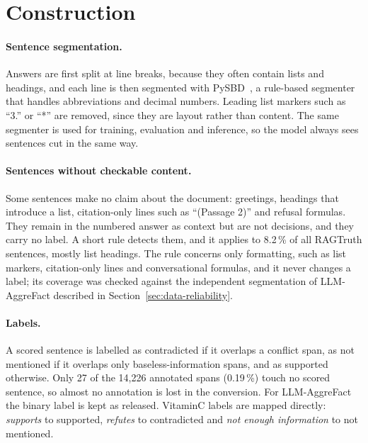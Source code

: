 \section{Construction}
\label{sec:data-construction}

\paragraph{Sentence segmentation.} Answers are first split at line breaks, because they often contain lists and
headings, and each line is then segmented with PySBD~\cite{sadvilkar2020pysbd}, a rule-based segmenter that handles
abbreviations and decimal numbers. Leading list markers such as ``3.'' or ``*'' are removed, since they are layout
rather than content. The same segmenter is used for training, evaluation and inference, so the model always sees
sentences cut in the same way.

\paragraph{Sentences without checkable content.} Some sentences make no claim about the document: greetings,
headings that introduce a list, citation-only lines such as ``(Passage 2)'' and refusal formulas. They remain in the
numbered answer as context but are not decisions, and they carry no label. A short rule detects them, and it applies
to 8.2\,\% of all RAGTruth sentences, mostly list headings. The rule concerns only formatting, such as list markers,
citation-only lines and conversational formulas, and it never changes a label; its coverage was checked against the
independent segmentation of LLM-AggreFact described in Section~\ref{sec:data-reliability}.

\paragraph{Labels.} A scored sentence is labelled as contradicted if it overlaps a conflict span, as not mentioned if
it overlaps only baseless-information spans, and as supported otherwise. Only 27 of the 14{,}226 annotated spans
(0.19\,\%) touch no scored sentence, so almost no annotation is lost in the conversion. For LLM-AggreFact the binary
label is kept as released. VitaminC labels are mapped directly: \emph{supports} to supported, \emph{refutes} to
contradicted and \emph{not enough information} to not mentioned.

